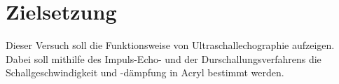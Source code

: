 \section{Zielsetzung}
\label{sec:Zielsetzung}

Dieser Versuch soll die Funktionsweise von Ultraschallechographie aufzeigen.
Dabei soll mithilfe des Impuls-Echo- und der Durschallungsverfahrens die Schallgeschwindigkeit und -dämpfung in Acryl bestimmt werden.